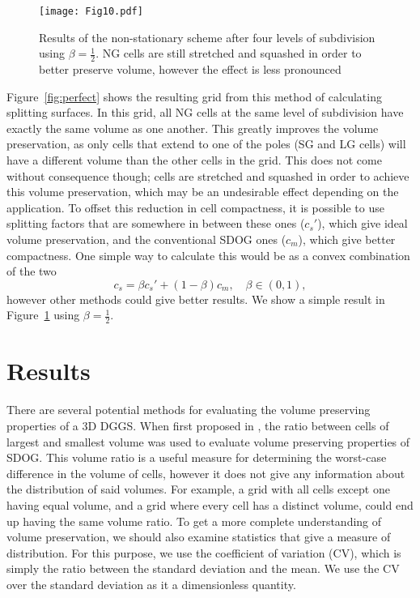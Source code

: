 \begin{figure}[tbp]
	\texttt{[image: Fig10.pdf]}
	\caption{Results of the non-stationary scheme after four levels of subdivision using $\beta = \frac{1}{2}$.
		NG cells are still stretched and squashed in order to better preserve volume, however the effect is less pronounced}
	\label{fig:balanced}
\end{figure}


Figure~\ref{fig:perfect} shows the resulting grid from this method of calculating splitting surfaces.
In this grid, all NG cells at the same level of subdivision have exactly the same volume as one another.
This greatly improves the volume preservation, as only cells that extend to one of the poles (SG and LG cells) will have a different volume than the other cells in the grid.
This does not come without consequence though; cells are stretched and squashed in order to achieve this volume preservation, which may be an undesirable effect depending on the application.
To offset this reduction in cell compactness, it is possible to use splitting factors that are somewhere in between these ones ($c_{s}'$), which give ideal volume preservation, and the conventional SDOG ones ($c_{m}$), which give better compactness.
One simple way to calculate this would be as a convex combination of the two
%
\begin{equation}
c_{s} = \beta c_{s}' + \left( 1 - \beta \right)c_{m}, \quad \beta \in \left( 0,1 \right),
\label {eq:beta}
\end{equation}
%
however other methods could give better results.
We show a simple result in Figure~\ref{fig:balanced} using $\beta = \frac{1}{2}$.

\section{Results}
There are several potential methods for evaluating the volume preserving properties of a 3D DGGS.
When first proposed in \cite{yu2009sdog}, the ratio between cells of largest and smallest volume was used to evaluate volume preserving properties of SDOG.
This volume ratio is a useful measure for determining the worst-case difference in the volume of cells, however it does not give any information about the distribution of said volumes.
For example, a grid with all cells except one having equal volume, and a grid where every cell has a distinct volume, could end up having the same volume ratio.
To get a more complete understanding of volume preservation, we should also examine statistics that give a measure of distribution.
For this purpose, we use the coefficient of variation (CV), which is simply the ratio between the standard deviation and the mean.
We use the CV over the standard deviation as it a dimensionless quantity.


